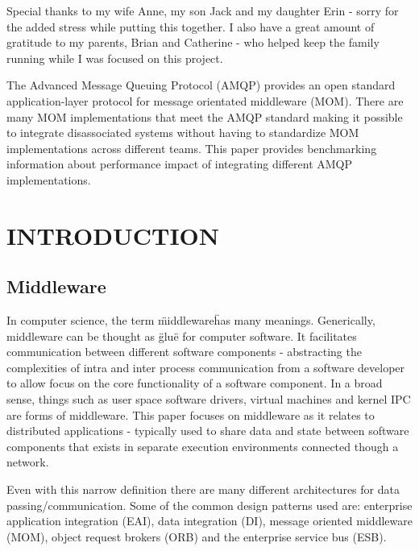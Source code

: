 \documentclass{thesis}
\author{David Joe Wade}
\begin{document}
 
\listoftodos
\titlepage            	 %
\tableofcontents          %
\listoftables          	 %
\listoffigures         	 %

Special thanks to my wife Anne, my son Jack and my daughter Erin - sorry for the added stress while putting this together.  I also have a great amount of gratitude to my parents, Brian and Catherine - who helped keep the family running while I was focused on this project.

The Advanced Message Queuing Protocol (AMQP) provides an open standard application-layer protocol for message orientated middleware (MOM).  There are many MOM implementations that meet the AMQP standard making it possible to integrate disassociated systems without having to standardize MOM implementations across different teams.    This paper provides benchmarking information about performance impact of integrating different AMQP implementations.  

\chapter{INTRODUCTION}

\section{Middleware}
In computer science, the term \"middleware\" has many meanings.  Generically, middleware can be thought as \"glue\"  for computer software.  It facilitates communication between different software components - abstracting the complexities of intra and inter process communication from a software developer to allow focus on the core functionality of a software component.  In a broad sense, things such as user space software drivers, virtual machines and kernel IPC are forms of middleware.  This paper focuses on middleware as it relates to distributed applications - typically used to share data and state between software components that exists in separate execution environments connected though a network.

Even with this narrow definition there are many different architectures for data passing/communication.  Some of the common design patterns used are: enterprise application integration (EAI), data integration (DI), message oriented middleware (MOM), object request brokers (ORB) and the enterprise service bus (ESB).  
\end{document}
